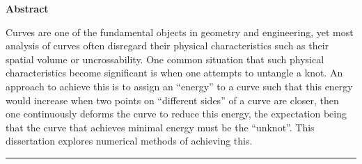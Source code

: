 \documentclass[../dissertation.tex]{subfiles}
\begin{document}
\thispagestyle{plain}
\begin{center}
    \Large
    \textbf{\titlename}
        
        
       
    \vspace{0.9cm}
    \textbf{Abstract}
\end{center}
Curves are one of the fundamental objects in geometry and engineering,
yet most analysis of curves often disregard their physical characteristics such as their spatial volume or uncrossability.
One common situation that such physical characteristics become significant is when one attempts to untangle a knot.
An approach to achieve this is to assign an ``energy'' to a curve such that
this energy would increase when two points on ``different sides'' of a curve are closer,
then one continuously deforms the curve to reduce this energy, 
the expectation being that the curve that achieves minimal energy must be the ``unknot''.
This dissertation explores numerical methods of achieving this.

\vspace{0.2cm}
\hrule
\end{document}
